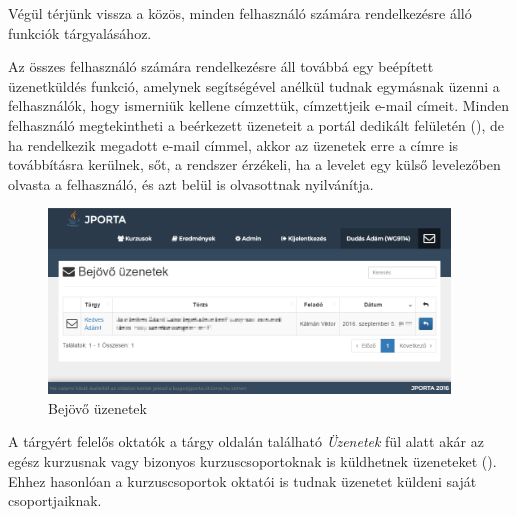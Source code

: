 \bigskip
Végül térjünk vissza a közös, minden felhasználó számára rendelkezésre álló funkciók tárgyalásához.

Az összes felhasználó számára rendelkezésre áll továbbá egy beépített üzenetküldés funkció, amelynek segítségével anélkül tudnak egymásnak üzenni a felhasználók, hogy ismerniük kellene címzettük, címzettjeik e-mail címeit.
Minden felhasználó megtekintheti a beérkezett üzeneteit a portál dedikált felületén (), de ha rendelkezik megadott e-mail címmel, akkor az üzenetek erre a címre is továbbításra kerülnek, sőt, a rendszer érzékeli, ha a levelet egy külső levelezőben olvasta a felhasználó, és azt belül is olvasottnak nyilvánítja.
\begin{figure}[h]
    \centering
    \includegraphics[width=0.95\textwidth]{figures/Jporta-inbox}
    \caption{Bejövő üzenetek}
    \label{figure:jporta-inbox}
\end{figure}
A tárgyért felelős oktatók a tárgy oldalán található \textit{Üzenetek} fül alatt akár az egész kurzusnak vagy bizonyos kurzuscsoportoknak is küldhetnek üzeneteket ().
Ehhez hasonlóan a kurzuscsoportok oktatói is tudnak üzenetet küldeni saját csoportjaiknak.
